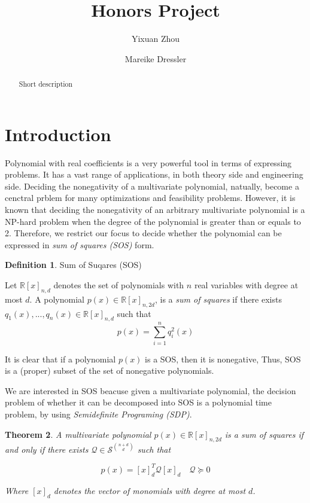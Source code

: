 \documentclass[12pt]{amsart}
\title{Honors Project}
\author{Yixuan Zhou} \author{Mareike Dressler} %
\numberwithin{equation}{section}
\newtheorem{thm}{Theorem}
\theoremstyle{definition}
\newtheorem{definition}[thm]{Definition}
\numberwithin{thm}{section}
\begin{document}
 

\begin{abstract}
Short description
\end{abstract}

\maketitle


\section{Introduction} 
Polynomial with real coefficients is a very powerful tool in terms of expressing problems. 
It has a vast range of applications, in both theory side and engineering side. 
Deciding the nonegativity of a multivariate polynomial, natually, become 
a cenctral prblem for many optimizations and feasibility problems. 
However, it is known that deciding the nonegativity of an arbitrary multivariate 
polynomial is a NP-hard problem when the degree of the polynomial is greater than or
equals to 2. Therefore, we restrict our focus to decide whether the polynomial can be 
expressed in \emph{sum of squares (SOS)} form. 

\begin{definition}
     Sum of Suqares (SOS)

     Let $\mathbb{R}[x]_{n, d}$ denotes the set of polynomials with $n$ real variables with
     degree at most $d$.
     A polynomial $p(x) \in \mathbb{R}[x]_{n, 2d}$, 
     is a \emph{sum of squares} if
     there exists $q_1(x),...,q_n(x) \in \mathbb{R}[x]_{n, d}$ such that
     \begin{equation}
          p(x) = \sum_{i = 1}^{n} q_i ^2 (x)
     \end{equation}
\end{definition}

It is clear that if a polynomial $p(x)$ is a SOS, then it is nonegative,
Thus, SOS is a (proper) subset of the set of nonegative polynomials. 

We are interested in SOS beacuse given a multivariate polynomial, the decision
problem of whether it can be decomposed into SOS is a polynomial time problem, by using
\emph{Semidefinite Programing (SDP)}.


\begin{thm}
     A multivariate polynomial $p(x) \in \mathbb{R}[x]_{n, 2d}$ is a sum of squares
     if and only if there exists $\mathcal{Q} \in \mathcal{S}^{{n+d \choose d}}$ such that
     
     \begin{equation}
          p(x) = [x]_d^T \mathcal{Q} [x]_d \quad \mathcal{Q} \succcurlyeq 0
     \end{equation}

     Where $[x]_d$ denotes the vector of monomials with degree at most $d$.
\end{thm}
\end{document}
